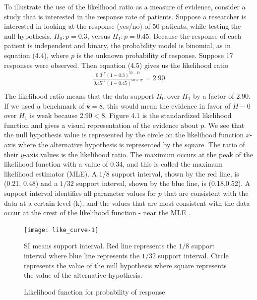 \documentclass[12pt]{report}\usepackage[]{graphicx}\usepackage[]{color}
\newlength{\li}\setlength{\li}{14.48pt}
\newlength{\di}\setlength{\di}{-3.5mm}
\begin{document}
To illustrate the use of the likelihood ratio as a measure of evidence, consider a study that is interested in the response rate of patients. Suppose a researcher is interested in looking at the response (yes/no) of 50 patients, while testing the null hypothesis, $H_0: p = 0.3$, versus $H_1: p = 0.45$. Because the response of each patient is independent and binary, the probability model is binomial, as in equation (4.4), where $p$ is the unknown probability of response. Suppose 17 responses were observed. Then equation (4.5) gives us the likelihood ratio     
\begin{equation}
\begin{aligned}
\frac{0.3^{17}(1-0.3)^{50-17}}{0.45^{17}(1-0.45)^{50-17}} = 2.90 \\
\end{aligned}
\end{equation}
The likelihood ratio means that the data support $H_0$ over $H_1$ by a factor of 2.90. If we used a benchmark of $k=8$, this would mean the evidence in favor of $H-0$ over $H_1$ is weak because $2.90 < 8$. Figure 4.1 is the standardized likelihood function and gives a visual representation of the evidence about $p$. We see that the null hypothesis value is represented by the circle on the likelihood function $x$-axis where the alternative hypothesis is represented by the square. The ratio of their $y$-axis values is the likelihood ratio. The maximum occurs at the peak of the likelihood function with a value of 0.34, and this is called the maximum likelihood estimator (MLE). A $1/8$ support interval, shown by the red line, is (0.21, 0.48) and a $1/32$ support interval, shown by the blue line, is (0.18,0.52). A support interval identifies all parameter values for $p$ that are consistent with the data at a certain level (k), and the values that are most consistent with the data occur at the crest of the likelihood function - near the MLE \cite{Blume2002}. 

\begin{figure}
\caption{Likelihood function for probability of response}
\begin{Schunk}


\centerline{\texttt{[image: like\_curve-1]} }

\end{Schunk}
\centering
\begin{minipage}{0.6\textwidth} %
{\scriptsize SI means support interval. Red line represents the $1/8$ support interval where blue line represents the $1/32$ support interval. Circle represents the value of the null hypothesis where square represents the value of the alternative hypothesis.\par}
\end{minipage}
\end{figure}
\end{document}
